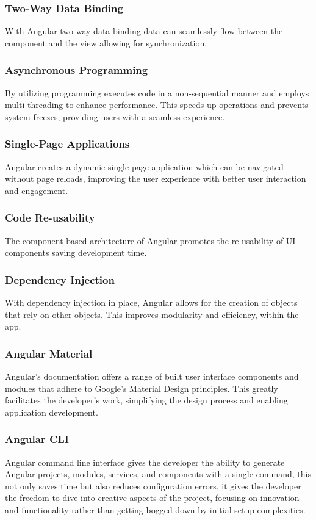 \subsubsection{Two-Way Data Binding} 
With Angular two way data binding data can seamlessly flow between the component and the view allowing for synchronization.

\subsubsection{Asynchronous Programming} 
By utilizing programming executes code in a non-sequential manner and employs multi-threading to enhance performance. This speeds up operations and prevents system freezes, providing users with a seamless experience.
 
\subsubsection{Single-Page Applications}
Angular creates a dynamic single-page application which can be navigated without page reloads, improving the user experience with better user interaction and engagement.

\subsubsection {Code Re-usability} 
The component-based architecture of Angular promotes the re-usability of UI components saving development time.

\subsubsection{Dependency Injection} 
With dependency injection in place, Angular allows for the creation of objects that rely on other objects. This improves modularity and efficiency, within the app.

\subsubsection{Angular Material} 
Angular's documentation offers a range of built user interface components and modules that adhere to Google's Material Design principles. This greatly facilitates the developer's work, simplifying the design process and enabling application development.

\subsubsection{Angular CLI} Angular command line interface gives the developer the ability to generate Angular projects, modules, services, and components with a single command, this not only saves time but also reduces configuration errors, it gives the developer the freedom to dive into creative aspects of the project, focusing on innovation and functionality rather than getting bogged down by initial setup complexities.

